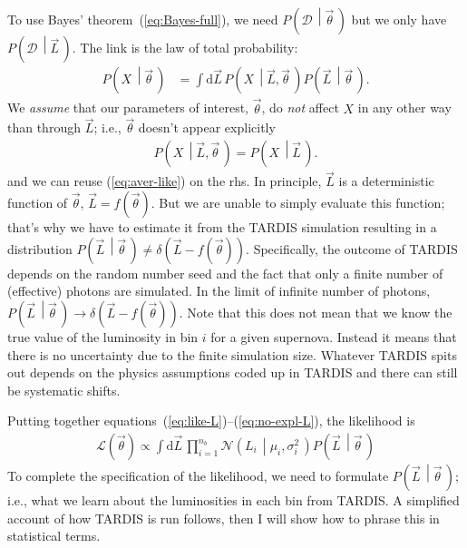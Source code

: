 \documentclass[a4,12pt]{article}
\newcommand{\data}{\ensuremath{\mathcal{D}}}
\newcommand{\given}[2]{\left(#1\, \middle| #2 \, \right)}
\newcommand{\gaussian}{\ensuremath{\mathcal{N}}}
\newcommand{\likelihood}{\ensuremath{\mathcal{L}}}
\newcommand{\Lumi}{\ensuremath{L_i}}
\newcommand{\rmdx}[1]{\mbox{d} #1 \,} %
\newcommand{\vecL}{\ensuremath{\vec{L}}}
\newcommand{\vecth}{\ensuremath{{\vec{\theta}}}}
\def \refeq#1{(\ref{eq:#1})}
\newcommand{\tardis}{TARDIS}
\begin{document}
To use Bayes' theorem~\refeq{Bayes-full}, we need
$P\given{\data}{\vecth}$ but we only have $P\given{\data}{\vecL}$. The
link is the law of total probability:
\begin{align}
  \label{eq:like-expanded}
  P\given{X}{\vecth} &= \int \rmdx{\vecL} P\given{X}{\vecL, \vecth} P\given{\vecL}{\vecth} .
\end{align}
We \emph{assume} that our parameters of interest, $\vecth$, do \emph{not}
affect $X$ in any other way than through $\vecL$; i.e., $\vecth$
doesn't appear explicitly
\begin{align}
  \label{eq:no-expl-L}
  P\given{X}{\vecL, \vecth} = P\given{X}{\vecL}.
\end{align}
and we can reuse \refeq{aver-like} on the rhs.  In principle, $\vecL$
is a deterministic function of $\vecth$, $\vecL = f(\vecth)$. But we
are unable to simply evaluate this function; that's why we have to
estimate it from the \tardis{} simulation resulting in a distribution
$P\given{\vecL}{\vecth} \ne \delta(\vecL - f(\vecth))$. Specifically,
the outcome of \tardis{} depends on the random number seed and the
fact that only a finite number of (effective) photons are
simulated. In the limit of infinite number of photons,
$P\given{\vecL}{\vecth} \to \delta(\vecL - f(\vecth))$. Note that this
does not mean that we know the true value of the luminosity in bin $i$
for a given supernova. Instead it means that there is no uncertainty
due to the finite simulation size. Whatever \tardis{} spits out
depends on the physics assumptions coded up in \tardis{} and there can
still be systematic shifts.

Putting together equations~\refeq{like-L}--\refeq{no-expl-L}, the
likelihood is
\begin{align}
  \label{eq:like-summary}
  \likelihood(\vecth) \propto \int \rmdx{\vecL} \prod_{i=1}^{n_b}
  \gaussian\given{\Lumi}{\mu_i, \sigma_i^2} P\given{\vecL}{\vecth}
\end{align}
To complete the specification of the likelihood, we need to formulate
$P\given{\vecL}{\vecth}$; i.e., what we learn about the luminosities
in each bin from \tardis. A simplified account of how \tardis{} is run
follows, then I will show how to phrase this in statistical terms.
\end{document}
